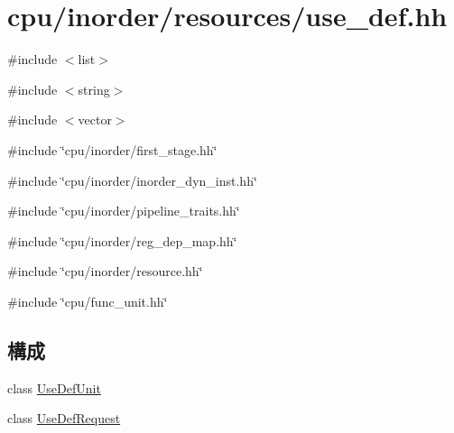 \hypertarget{use__def_8hh}{
\section{cpu/inorder/resources/use\_\-def.hh}
\label{use__def_8hh}
}
{\ttfamily \#include $<$list$>$}\par
{\ttfamily \#include $<$string$>$}\par
{\ttfamily \#include $<$vector$>$}\par
{\ttfamily \#include \char`\"{}cpu/inorder/first\_\-stage.hh\char`\"{}}\par
{\ttfamily \#include \char`\"{}cpu/inorder/inorder\_\-dyn\_\-inst.hh\char`\"{}}\par
{\ttfamily \#include \char`\"{}cpu/inorder/pipeline\_\-traits.hh\char`\"{}}\par
{\ttfamily \#include \char`\"{}cpu/inorder/reg\_\-dep\_\-map.hh\char`\"{}}\par
{\ttfamily \#include \char`\"{}cpu/inorder/resource.hh\char`\"{}}\par
{\ttfamily \#include \char`\"{}cpu/func\_\-unit.hh\char`\"{}}\par
\subsection*{構成}
\begin{DoxyCompactItemize}
\item 
class \hyperlink{classUseDefUnit}{UseDefUnit}
\item 
class \hyperlink{classUseDefUnit_1_1UseDefRequest}{UseDefRequest}
\end{DoxyCompactItemize}
